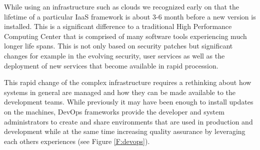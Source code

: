 \documentclass{article}
\begin{document}
While using an infrastructure such as clouds we recognized early on
that the lifetime of a particular IaaS framework is about 3-6 month
before a new version is installed. This is a significant difference to
a traditional High Performance Computing Center that is comprised of
many software tools experiencing much longer life spans. This is not
only based on security patches but significant changes for example in
the evolving security, user services as well as the deployment of new
services that become available in rapid procession.

This rapid change of the complex infrastructure requires a rethinking
about how systems in general are managed and how they can be made
available to the development teams. While previously it may have been
enough to install updates on the machines, DevOps frameworks provide
the developer and system administrators to create and share
environments that are used in production and development while at the
same time increasing quality assurance by leveraging each others
experiences (see Figure \ref{F:devops}).
\end{document}

